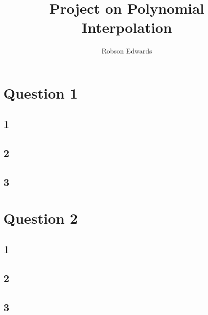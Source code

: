 \documentclass[11pt, oneside]{article}
\title{Project on Polynomial Interpolation}
\author{Robson Edwards}
\begin{document}
\maketitle

\section*{Question 1}

\subsection*{1}

\subsection*{2}

\subsection*{3}

\section*{Question 2}

\subsection*{1}

\subsection*{2}

\subsection*{3}
\end{document}
